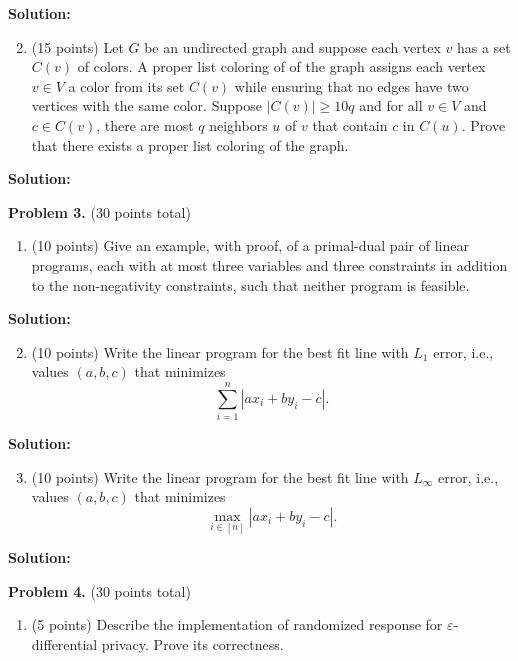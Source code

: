 \documentclass[11pt]{article}
\newcommand{\eps}{\varepsilon}
\begin{document}
\noindent\textbf{Solution:}

\begin{enumerate}
\setcounter{enumi}{1}
\item (15 points)
Let $G$ be an undirected graph and suppose each vertex $v$ has a set $C(v)$ of colors. 
A proper list coloring of of the graph assigns each vertex $v\in V$ a color from its set $C(v)$ while ensuring that no edges have two vertices with the same color. 
Suppose $|C(v)|\ge 10q$ and for all $v\in V$ and $c\in C(v)$, there are most $q$ neighbors $u$ of $v$ that contain $c$ in $C(u)$. 
Prove that there exists a proper list coloring of the graph. 
\end{enumerate}

\noindent\textbf{Solution:}



\newpage\noindent
\textbf{Problem 3.} (30 points total)
\begin{enumerate}
\item (10 points)
Give an example, with proof, of a primal-dual pair of linear programs, each with at most three variables and three constraints in addition to the non-negativity constraints, such that neither program is feasible. 
\end{enumerate}

\noindent\textbf{Solution:}

\begin{enumerate}
\setcounter{enumi}{1}
\item (10 points)
Write the linear program for the best fit line with $L_1$ error, i.e., values $(a,b,c)$ that minimizes 
\[\sum_{i=1}^n|ax_i+by_i-c|.\]
\end{enumerate}

\noindent\textbf{Solution:}

\begin{enumerate}
\setcounter{enumi}{2}
\item (10 points)
Write the linear program for the best fit line with $L_\infty$ error, i.e., values $(a,b,c)$ that minimizes 
\[\max_{i\in[n]}|ax_i+by_i-c|.\] 
\end{enumerate}

\noindent\textbf{Solution:}


\newpage\noindent
\textbf{Problem 4.} (30 points total)
\begin{enumerate}
\item (5 points)
Describe the implementation of randomized response for $\eps$-differential privacy. 
Prove its correctness.
\end{enumerate}
\end{document}

